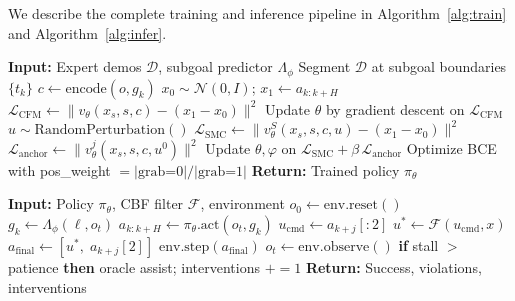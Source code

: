 \documentclass[11pt,a4paper]{article}
\begin{document}
We describe the complete training and inference pipeline in Algorithm~\ref{alg:train}
and Algorithm~\ref{alg:infer}.

\begin{algorithm}[t]
\caption{Training: Steerable VLA Flow-Matching Hierarchy}
\label{alg:train}
\begin{algorithmic}[1]
\State \textbf{Input:} Expert demos $\mathcal{D}$, subgoal predictor $\Lambda_\phi$
\State Segment $\mathcal{D}$ at subgoal boundaries $\{t_k\}$
\State {}
    \State $c \gets \mathrm{encode}(o, g_k)$ 
    \State $x_0 \sim \mathcal{N}(0, I)$; $x_1 \gets a_{k:k+H}$
    \State $\mathcal{L}_{\mathrm{CFM}} \gets \|v_\theta(x_s, s, c) - (x_1 - x_0)\|^2$
    \State Update $\theta$ by gradient descent on $\mathcal{L}_{\mathrm{CFM}}$
  \EndFor
\EndFor
\State {}
    \State $u \sim \text{RandomPerturbation}()$ 
    \State $\mathcal{L}_{\mathrm{SMC}} \gets \|v_\theta^S(x_s, s, c, u) - (x_1 - x_0)\|^2$
    \State $\mathcal{L}_{\mathrm{anchor}} \gets \|v_\theta^j(x_s, s, c, u^0)\|^2$
    \State Update $\theta, \varphi$ on $\mathcal{L}_{\mathrm{SMC}} + \beta\,\mathcal{L}_{\mathrm{anchor}}$
  \EndFor
\EndFor
\State {}
\State Optimize BCE with pos\_weight $= |\text{grab=0}| / |\text{grab=1}|$
\State \textbf{Return:} Trained policy $\pi_\theta$
\end{algorithmic}
\end{algorithm}

\begin{algorithm}[t]
\caption{Inference: Receding-Horizon Execution with Safety Filter}
\label{alg:infer}
\begin{algorithmic}[1]
\State \textbf{Input:} Policy $\pi_\theta$, CBF filter $\mathcal{F}$, environment
\State $o_0 \gets \mathrm{env.reset}()$
  \State $g_k \gets \Lambda_\phi(\ell, o_t)$ 
  \State $a_{k:k+H} \gets \pi_\theta.\mathrm{act}(o_t, g_k)$ 
    \State $u_{\mathrm{cmd}} \gets a_{k+j}[:2]$ 
    \State $u^{*} \gets \mathcal{F}(u_{\mathrm{cmd}}, x)$ 
    \State $a_{\mathrm{final}} \gets [u^{*},\; a_{k+j}[2]]$ 
    \State $\mathrm{env.step}(a_{\mathrm{final}})$
  \EndFor
  \State $o_{t} \gets \mathrm{env.observe}()$
  \State \textbf{if} stall $>$ patience \textbf{then} oracle assist; interventions $+{=} 1$
\EndWhile
\State \textbf{Return:} Success, violations, interventions
\end{algorithmic}
\end{algorithm}
\end{document}
